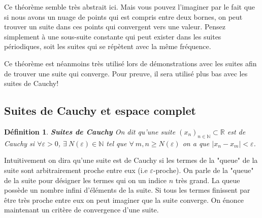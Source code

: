 \documentclass[a4paper, 12pt, french, twoside]{article}
\newtheorem{defi}[theorem]{Définition}
\newcommand{\Nn}{{\mathbb{N}}}
\newcommand{\Rr}{{\mathbb{R}}}
\begin{document}

 

Ce théorème semble très abstrait ici. Mais vous pouvez l'imaginer par le fait que si nous avons un nuage de points qui est compris entre deux bornes, on peut trouver un suite dans ces points qui convergent vers une valeur. Pensez simplement à une sous-suite constante qui peut exister dans les suites périodiques, soit les suites qui se répètent avec la même fréquence.

Ce théorème est néanmoins très utilisé lors de démonstrations avec les suites afin de trouver une suite qui converge. Pour preuve, il sera utilisé plus bas avec les suites de Cauchy!

\subsection{Suites de Cauchy et espace complet}
\begin{defi}{\textbf{Suites de Cauchy}} 
   On dit qu'une suite $(x_n)_{n \in \Nn} \subset \Rr $ est de Cauchy si $\forall \varepsilon >0 $, $\exists \: N(\varepsilon) \in \Nn $ tel que $\forall \: m,n \ge N(\varepsilon)$ on a que $|x_n - x_m| < \varepsilon$.  
\end{defi}
Intuitivement on dira qu'une suite est de Cauchy si les termes de la "queue" de la suite sont arbitrairement proche entre eux (i.e $\varepsilon$-proche).  On parle de la "queue" de la suite pour désigner les termes qui on un indice $n$ très grand. La queue possède un nombre infini d'éléments de la suite.  Si tous les termes finissent par être très proche entre eux on peut imaginer que la suite converge. On énonce maintenant un critère de convergence d'une suite. 
\end{document}
